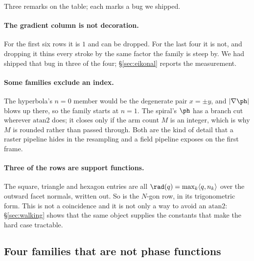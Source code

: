 Three remarks on the table; each marks a bug we shipped.

\paragraph{The gradient column is not decoration.} For the first six rows it is
$1$ and can be dropped. For the last four it is not, and dropping it thins every
stroke by the same factor the family is steep by. We had shipped that bug in
three of the four; \S\ref{sec:eikonal} reports the measurement.

\paragraph{Some families exclude an index.} The hyperbola's $n=0$ member would be
the degenerate pair $x=\pm y$, and $\lvert\nabla\ph\rvert$ blows up there, so the
family starts at $n=1$. The spiral's $\ph$ has a branch cut wherever
$\mathrm{atan2}$ does; it closes only if the arm count $M$ is an integer, which is
why $M$ is rounded rather than passed through. Both are the kind of detail that a
raster pipeline hides in the resampling and a field pipeline exposes on the
first frame.

\paragraph{Three of the rows are support functions.} The square, triangle and
hexagon entries are all $\rad(q)=\max_k\langle q,n_k\rangle$ over the outward
facet normals, written out. So is the $N$-gon row, in its trigonometric form. This
is not a coincidence and it is not only a way to avoid an $\mathrm{atan2}$:
\S\ref{sec:walking} shows that the same object supplies the constants that make
the hard case tractable.

\subsection{Four families that are not phase functions}

